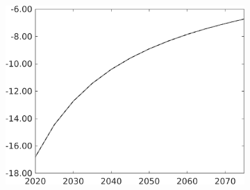\begin{figure}[h!!]
\begin{subfigure}{0.75\textwidth}
\begin{minipage}[]{0.32\textwidth}
	\end{minipage}
\begin{minipage}[]{0.32\textwidth}
\includegraphics[width=1\textwidth]{../../codding_model/own_basedOnFried/optimalPol_010922_revision/figures/all_13Sept22/PerdifNoTauf_Equlab_regime0_CompTaul_sn_spillover0_nsk0_xgr0_knspil0_sep0_LFlimit0_emsbase0_countec0_GovRev0_etaa0.79_lgd0.png}
\end{minipage}
		\end{subfigure} 
		

\end{figure}
